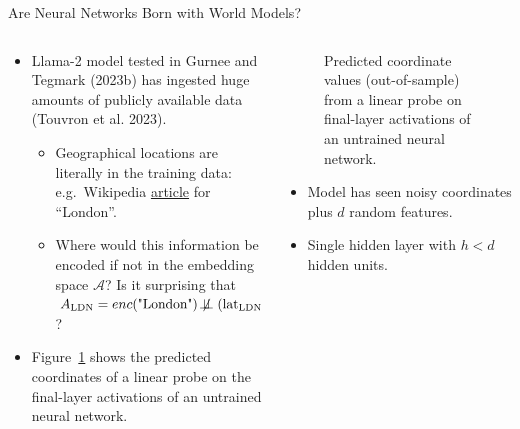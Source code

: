 \documentclass[
  10pt,
  ignorenonframetext,
  aspectratio=169,
  notheorems]{beamer}
\providecommand{\tightlist}{%
  \setlength{\itemsep}{0pt}\setlength{\parskip}{0pt}}\usepackage{longtable,booktabs,array}
\begin{document}
\begin{frame}{Are Neural Networks Born with World Models?}
\label{are-neural-networks-born-with-world-models}
\begin{columns}[T]
\begin{column}{0.6\textwidth}
\begin{itemize}
\tightlist
\item
  Llama-2 model tested in Gurnee and Tegmark (2023b) has ingested huge
  amounts of publicly available data (Touvron et al. 2023).

  \begin{itemize}
  \tightlist
  \item
    Geographical locations are literally in the training data:
    e.g.~Wikipedia \href{https://en.wikipedia.org/wiki/London}{article}
    for ``London''.
  \item
    Where would this information be encoded if not in the embedding
    space \(\mathcal{A}\)? Is it surprising that
    \(A_{\text{LDN}}=enc(\text{"London"}) \not\!\perp\!\!\!\perp (\text{lat}_{\text{LDN}},\text{long}_{\text{LDN}})\)?
  \end{itemize}
\item
  Figure~\ref{fig-map} shows the predicted coordinates of a linear probe
  on the final-layer activations of an untrained neural network.
\end{itemize}
\end{column}

\begin{column}{0.4\textwidth}
\begin{figure}


\caption{\label{fig-map}Predicted coordinate values (out-of-sample) from
a linear probe on final-layer activations of an untrained neural
network.}

\end{figure}%

\begin{itemize}
\tightlist
\item
  Model has seen noisy coordinates plus \(d\) random features.
\item
  Single hidden layer with \(h < d\) hidden units.
\end{itemize}
\end{column}
\end{columns}
\end{frame}
\end{document}
